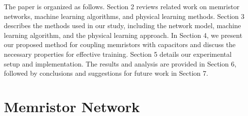 \documentclass[reprint,superscriptaddress,prb,showkeys]{revtex4-2}
\begin{document}


The paper is organized as follows. Section 2 reviews related work on memristor networks, machine learning algorithms, and physical learning methods. Section 3 describes the methods used in our study, including the network model, machine learning algorithm, and the physical learning approach. In Section 4, we present our proposed method for coupling memristors with capacitors and discuss the necessary properties for effective training. Section 5 details our experimental setup and implementation. The results and analysis are provided in Section 6, followed by conclusions and suggestions for future work in Section 7.

\newpage

\section{\label{sec:memristor_network}Memristor Network}
\end{document}
